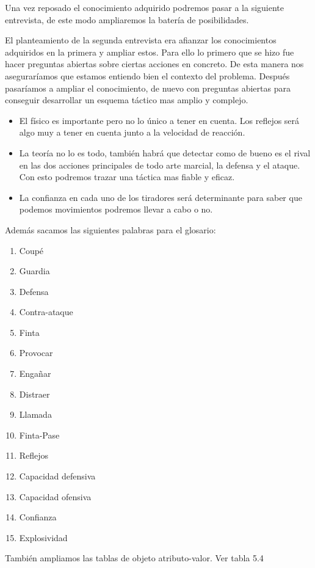 Una vez reposado el conocimiento adquirido podremos pasar a la siguiente entrevista,
de este modo ampliaremos la batería de posibilidades.

El planteamiento de la segunda entrevista era afianzar los conocimientos adquiridos en
la primera y ampliar estos. Para ello lo primero que se hizo fue hacer preguntas abiertas
sobre ciertas acciones en concreto. De esta manera nos aseguraríamos que estamos entiendo
bien el contexto del problema. Después pasaríamos a ampliar el conocimiento, de nuevo
con preguntas abiertas para conseguir desarrollar un esquema táctico mas amplio y complejo.

\begin{itemize}
  \item El físico es importante pero no lo único a tener en cuenta. Los reflejos será
    algo muy a tener en cuenta junto a la velocidad de reacción.
  \item La teoría no lo es todo, también habrá que detectar como de bueno es el rival
    en las dos acciones principales de todo arte marcial, la defensa y el ataque.
    Con esto podremos trazar una táctica mas fiable y eficaz.
  \item La confianza en cada uno de los tiradores será determinante para saber
    que podemos movimientos podremos llevar a cabo o no.
\end{itemize}

Además sacamos las siguientes palabras para el glosario:

\begin{enumerate}
  \item Coupé
  \item Guardia
  \item Defensa
  \item Contra-ataque
  \item Finta
  \item Provocar
  \item Engañar
  \item Distraer
  \item Llamada
  \item Finta-Pase
  \item Reflejos
  \item Capacidad defensiva
  \item Capacidad ofensiva
  \item Confianza
  \item Explosividad
\end{enumerate}

También ampliamos las tablas de objeto atributo-valor. Ver tabla 5.4

